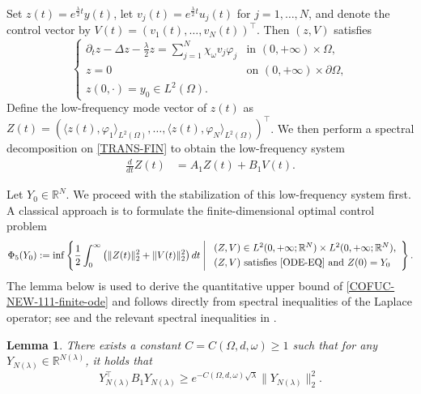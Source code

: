 \documentclass[a4paper]{article}
\newtheorem{lemma}[theorem]{Lemma}
\numberwithin{equation}{section}
\begin{document}
Set $z(t) = e^{\frac {\lambda}2 t} y(t)$, let $v_j(t) = e^{\frac {\lambda}2  t} u_j(t)$ for $j=1,\dots,N$, and denote the control vector by $V(t) = (v_1(t),\dots,v_N(t))^\top$. Then $(z,V)$ satisfies
\begin{equation}\label{TRANS-FIN}
\begin{cases}
\partial_t z - \Delta z - \frac \lambda 2z = \sum_{j=1}^N \chi_\omega v_j \varphi_j & \text{in } (0,+\infty)\times \Omega, \\
z = 0 & \text{on } (0,+\infty)\times \partial\Omega, \\
z(0,\cdot) = y_0 \in L^2(\Omega).
\end{cases}
\end{equation}
Define the low-frequency mode vector of $z(t)$ as $Z(t)=\left( \langle z(t), \varphi_1 \rangle_{L^2(\Omega)}, \dots, \langle z(t), \varphi_N \rangle_{L^2(\Omega)} \right)^\top $.
We then perform a spectral decomposition on \eqref{TRANS-FIN} to obtain the low-frequency system
\begin{equation}\label{ODE-EQ}
\begin{aligned}
\frac{d}{dt}  Z(t)&=A_1Z(t)+B_1V(t).
\end{aligned}
\end{equation}

Let $Y_0 \in\mathbb{R}^N $. We proceed with the stabilization of this low-frequency system first. A classical approach is to formulate the finite-dimensional optimal control problem
\begin{equation}\label{COFUC-NEW-111-finite-ode}
\Phi_5(Y_0):= {\inf}\left\{  \frac{1}{2} \int_0^{\infty} \left( \|Z(t)\|_2^2 + \|V(t)\|_2^2 \right)  dt \;\middle|\;
\begin{array}{l}
(Z,V)\in L^2(0,+\infty;\mathbb R^N)\times L^2(0,+\infty;\mathbb R^N),\\[1mm]
(Z,V)\ \text{satisfies \eqref{ODE-EQ} and $Z(0)=Y_0$} 
\end{array}\right\}.
\end{equation}
The lemma below is used to derive the quantitative upper bound of \eqref{COFUC-NEW-111-finite-ode} and follows directly from spectral inequalities of the Laplace operator; see \cite[Lemma 2.6]{X2} and the relevant spectral inequalities in \cite{LL,LR,LZ}.

\begin{lemma}\label{lemma2.6}
There exists a constant $C=C(\Omega,d,\omega)\ge 1$ such that for any $Y_{N(\lambda)} \in \mathbb{R}^{N(\lambda)}$, it holds that
\begin{equation}\label{spectral-ineq-app}
Y_{N(\lambda)}^\top B_1 Y_{N(\lambda)}\geq e^{-C(\Omega, d,\omega)\sqrt{\lambda}} \|Y_{N(\lambda)}\|^2_2.
\end{equation}
\end{lemma}
\end{document}
